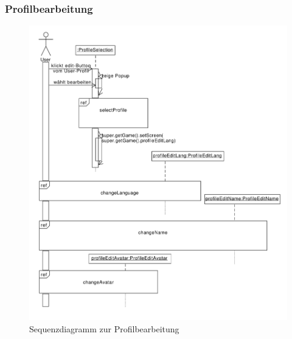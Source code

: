 \subsubsection{Profilbearbeitung}
\begin{figure}[H]
\centering
\includegraphics[scale=0.55]{./sections/sequence_diagrams/profile_scenarios/ProfileEdit.pdf}
\caption{Sequenzdiagramm zur Profilbearbeitung}
\end{figure}

